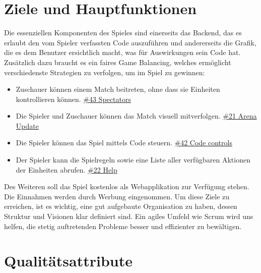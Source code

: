 \documentclass[a4paper, 11pt]{scrartcl}
\let\oldsection\section
\renewcommand\section{\clearpage\oldsection}
\begin{document}
\section{Ziele und Hauptfunktionen}

Die essenziellen Komponenten des Spieles sind einerseits das Backend, das es erlaubt den vom Spieler verfassten Code auszuführen und andererseits die Grafik, die es dem Benutzer ersichtlich macht, was für Auswirkungen sein Code hat. Zusätzlich dazu braucht es ein faires Game Balancing, welches ermöglicht verschiedenste Strategien zu verfolgen, um im Spiel zu gewinnen:

\begin{itemize}
  \item Zuschauer können einem Match beitreten, ohne dass sie Einheiten kontrollieren können. \href{https://dev.azure.com/schaumic/darwin/_workitems/edit/43/}{\#43 Spectators}
  \item Die Spieler und Zuschauer können das Match visuell mitverfolgen. \href{https://dev.azure.com/schaumic/darwin/_workitems/edit/21/}{\#21 Arena Update}
  \item Die Spieler können das Spiel mittels Code steuern. \href{https://dev.azure.com/schaumic/darwin/_workitems/edit/42/}{\#42 Code controls}
  \item Der Spieler kann die Spielregeln sowie eine Liste aller verfügbaren Aktionen der Einheiten abrufen. \href{https://dev.azure.com/schaumic/darwin/_workitems/edit/22/}{\#22 Help}
\end{itemize}

Des Weiteren soll das Spiel kostenlos als Webapplikation zur Verfügung stehen. Die Einnahmen werden durch Werbung eingenommen.
Um diese Ziele zu erreichen, ist es wichtig, eine gut aufgebaute Organisation zu haben, dessen Struktur und Visionen klar definiert sind. Ein agiles Umfeld wie Scrum wird uns helfen, die stetig auftretenden Probleme
besser und effizienter zu bewältigen.

\section{Qualitätsattribute}
\end{document}
